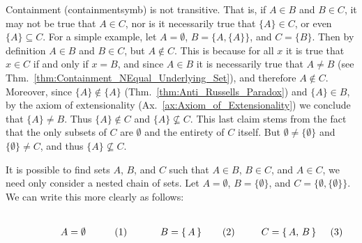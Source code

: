         Containment (\gls{containmentsymb}) is not transitive. That is, if
        $A\in{B}$ and $B\in{C}$, it may not be true that $A\in{C}$, nor is it
        necessarily true that $\{A\}\in{C}$, or even $\{A\}\subseteq{C}$. For a
        simple example, let $A=\emptyset$, $B=\{A,\{A\}\}$, and
        $C=\{B\}$. Then by definition $A\in{B}$ and $B\in{C}$, but $A\notin{C}$.
        This is because for all $x$ it is true that $x\in{C}$ if and only if
        $x=B$, and since $A\in{B}$ it is necessarily true that $A\ne{B}$
        (see Thm.~\ref{thm:Containment_NEqual_Underlying_Set}), and therefore
        $A\notin{C}$. Moreover, since $\{A\}\notin\{A\}$
        (Thm.~\ref{thm:Anti_Russells_Paradox}) and $\{A\}\in{B}$, by the axiom
        of extensionality (Ax.~\ref{ax:Axiom_of_Extensionality}) we conclude
        that $\{A\}\ne{B}$. Thus $\{A\}\notin{C}$ and $\{A\}\nsubseteq{C}$. This
        last claim stems from the fact that the only subsets of $C$ are
        $\emptyset$ and the entirety of $C$ itself. But
        $\emptyset\ne\{\emptyset\}$ and $\{\emptyset\}\ne{C}$, and thus
        $\{A\}\nsubseteq{C}$.
        \par\hfill\par
        It is possible to find sets $A$, $B$, and $C$ such that $A\in{B}$,
        $B\in{C}$, and $A\in{C}$, we need only consider a nested chain of sets.
        Let $A=\emptyset$, $B=\{\emptyset\}$, and
        $C=\{\emptyset,\{\emptyset\}\}$. We can write this more clearly as
        follows:
        \par
        \begin{subequations}
            \begin{minipage}[b]{0.32\textwidth}
                \centering
                \begin{equation}
                    A=\emptyset
                \end{equation}
            \end{minipage}
            \hfill
            \begin{minipage}[b]{0.32\textwidth}
                \centering
                \begin{equation}
                    B=\{\,A\,\}
                \end{equation}
            \end{minipage}
            \hfill
            \begin{minipage}[b]{0.32\textwidth}
                \centering
                \begin{equation}
                    C=\{\,A,\,B\,\}
                \end{equation}
            \end{minipage}
        \end{subequations}
